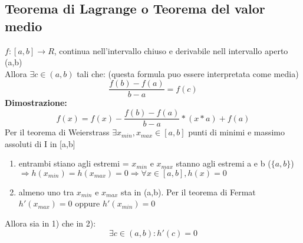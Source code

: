 \documentclass{article}
\begin{document}
        \subsection{Teorema di Lagrange o Teorema del valor medio}
        \begin{flushleft}
          $f:[a,b]\to R$, continua nell'intervallo chiuso e derivabile nell intervallo aperto (a,b) \\ 
          Allora $\exists c \in (a,b)$ tali che: (questa formula puo essere interpretata come media)
          \begin{equation}
            \frac{f(b)-f(a)}{b-a}=f(c)
          \end{equation}
        \textbf{Dimostrazione:} 
          \begin{equation}
            f(x)=f(x)-\frac{f(b)-f(a)}{b-a}*(x*a)+f(a) 
          \end{equation}
          Per il teorema di Weierstrass $\exists x_{min},x_{max} \in [a,b]$ punti di minimi e massimo assoluti di I in [a,b]
          \begin{enumerate}
            \item entrambi stiano agli estremi = $x_{min}$ e $x_{max}$ stanno agli estremi a e b ($\{a,b\}$)
              $\Rightarrow h(x_{min})=h(x_{max})=0 \Rightarrow \forall x \in [a,b], h(x)=0$ 
            \item almeno uno tra $x_{min}$ e $x_{max}$ sta in (a,b). Per il teorema di Fermat $h'(x_{max})=0$ oppure $h'(x_{min})=0$
          \end{enumerate}
          Allora sia in 1) che in 2):
          \begin{equation}
            \exists c \in (a,b): h'(c)=0
          \end{equation}
        \end{flushleft}
\end{document}
